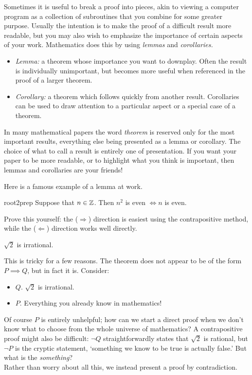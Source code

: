 
Sometimes it is useful to break a proof into pieces, akin to viewing a computer program as a collection of subroutines that you combine for some greater purpose. Usually the intention is to make the proof of a difficult result more readable, but you may also wish to emphasize the importance of certain aspects of your work. Mathematics does this by using \emph{lemmas} and \emph{corollaries.}

\begin{itemize}\setlength{\itemsep}{0pt}
  \item[]\emph{Lemma:} a theorem whose importance you want to downplay. Often the result is individually unimportant, but becomes more useful when referenced in the proof of a larger theorem.
  \item[]\emph{Corollary:} a theorem which follows quickly from another result. Corollaries can be used to draw attention to a particular aspect or a special case of a theorem.
\end{itemize}

 In many mathematical papers the word \emph{theorem} is reserved only for the most important results, everything else being presented as a lemma or corollary. The choice of what to call a result is entirely one of presentation. If you want your paper to be more readable, or to highlight what you think is important, then lemmas and corollaries are your friends!
 

Here is a famous example of a lemma at work.

\begin{lemm}{}{root2prep}
Suppose that $n\in\mathbb{Z}$. Then $n^2$ is even $\iff n$ is even.
\end{lemm}

 Prove this yourself: the ($\Rightarrow$) direction is easiest using the contrapositive method, while the ($\Leftarrow$) direction works well directly.

\begin{thm}{}{}
$\sqrt 2$ is irrational.
\end{thm}

 This is tricky for a few reasons. The theorem does not appear to be of the form $P\implies Q$, but in fact it is. Consider:
\begin{itemize}\setlength{\itemsep}{0pt}
  \item[]{$Q$.} $\sqrt 2$ is irrational.
  \item[]{$P$.} Everything you already know in mathematics!
\end{itemize}
Of course $P$ is entirely unhelpful; how can we start a direct proof when we don't know what to choose from the whole universe of mathematics? A contrapositive proof might also be difficult: $\neg Q$ straightforwardly states that $\sqrt 2$ is rational, but $\neg P$ is the cryptic statement, `something we know to be true is actually false.' But what is the \emph{something}?\\
Rather than worry about all this, we instead present a proof by contradiction.

